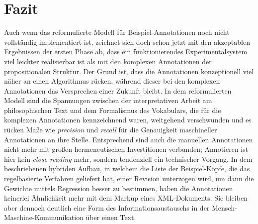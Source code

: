 \documentclass{article}
\newcommand*{\englisch}[1]{\foreignlanguage{english}{\textit{#1}}}%
\begin{document}
\section{Fazit}

Auch wenn das reformulierte Modell für Beispiel-Annotationen noch
nicht vollständig implementiert ist, zeichnet sich doch schon jetzt
mit den akzeptablen Ergebnissen der ersten Phase ab, dass ein
funktionierendes Experimentalsystem viel leichter realisierbar ist als
mit den komplexen Annotationen der propositionalen Struktur. Der Grund
ist, dass die Annotationen konzeptionell viel näher an einen
Algorithmus rücken, während dieser bei den komplexen Annotationen das
Versprechen einer Zukunft bleibt. In dem reformulierten Modell sind
die Spannungen zwischen der interpretativen Arbeit am philosophischen
Text und dem Formalismus des Vokabulars, die für die komplexen
Annotationen kennzeichnend waren, weitgehend verschwunden und es
rücken Maße wie \englisch{precision} und \englisch{recall} für die
Genauigkeit maschineller Annotationen an ihre Stelle. Entsprechend
sind auch die manuellen Annotationen nicht mehr mit großen
hermeneutischen Investitionen verbunden; Annotieren ist hier kein
\englisch{close reading} mehr, sondern tendenziell ein technischer
Vorgang. In dem beschriebenen hybriden Aufbau, in welchem die Liste
der Beispiel-Köpfe, die das regelbasierte Verfahren geliefert hat,
einer Revision unterzogen wird, um dann die Gewichte mittels
Regression besser zu bestimmen, haben die Annotationen keinerlei
Ähnlichkeit mehr mit dem Markup eines XML-Dokuments. Sie bleiben aber
dennoch deutlich eine Form des Informationsaustauschs in der
Mensch-Maschine-Kommunikation über einen Text.

\printbibliography



\end{document}
